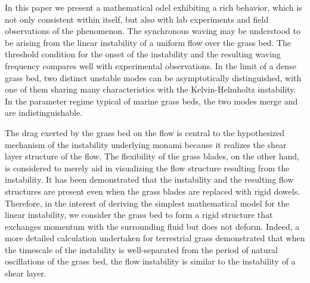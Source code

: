 \documentclass[aps,prl,reprint,twocolumn,showpacs,superscriptaddress,10pt]{revtex4-1}  %
\newcommand{\shreyas}[1]{}
\begin{document}
In this paper we present a mathematical \shreyas model exhibiting a rich behavior, which is not only consistent within itself, but also with lab experiments and field observations of the phenomenon.
The synchronous waving may be understood to be arising from the linear instability of a uniform flow over the grass bed. 
The threshold condition for the onset of the instability and the resulting waving frequency compares well with experimental observations.
In the limit of a dense grass bed, two distinct unstable modes can be asymptotically distinguished, with one of them sharing many characteristics with the Kelvin-Helmholtz instability. 
In the parameter regime typical of marine grass beds, the two modes merge and are indistinguishable.

The drag exerted by the grass bed on the flow is central to the hypothesized mechanism\cite{Ghisal02} of the instability underlying monami because it realizes the shear layer structure of the flow. 
The flexibility of the grass blades, on the other hand, is considered to merely aid in visualizing the flow structure resulting from the instability\cite{Nepf2012}. 
It has been demonstrated that the instability and the resulting flow structures are present even when the grass blades are replaced with rigid dowels\cite{Ghisal02}. 
Therefore, in the interest of deriving the simplest mathematical model for the linear instability, we consider the grass bed to form a rigid structure that exchanges momentum with the surrounding fluid but does not deform. 
Indeed, a more detailed calculation undertaken for terrestrial grass demonstrated\cite{Delangre06} that when the timescale of the instability is well-separated from the period of natural oscillations of the grass bed, 
the flow instability is similar to the instability of a shear layer. 
\end{document}
